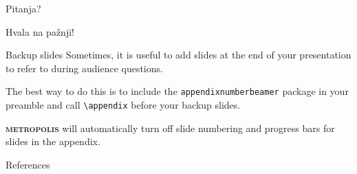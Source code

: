 \documentclass[10pt]{beamer}
\newcommand{\themename}{\textbf{\textsc{metropolis}}\xspace}
\begin{document}
\begin{frame}[standout]
  Pitanja?
\end{frame}
\begin{frame}[standout]
  Hvala na pažnji!
\end{frame}

\appendix

\begin{frame}[fragile]{Backup slides}
  Sometimes, it is useful to add slides at the end of your presentation to
  refer to during audience questions.

  The best way to do this is to include the \verb|appendixnumberbeamer|
  package in your preamble and call \verb|\appendix| before your backup slides.

  \themename will automatically turn off slide numbering and progress bars for
  slides in the appendix.
\end{frame}

\begin{frame}[allowframebreaks]{References}

  
  

\end{frame}
\end{document}
